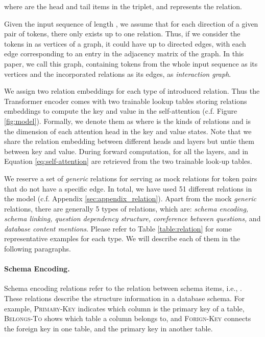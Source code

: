 \documentclass[11pt]{article}
\begin{document}
where  are the head and tail items in the triplet, and  represents the relation.

Given the input sequence  of length , we assume that for each direction of a given pair of tokens, there only exists up to one relation. Thus, if we consider the tokens in  as vertices of a graph, it could have up to  directed edges, with each edge corresponding to an entry in the adjacency matrix of the graph. In this paper, we call this graph, containing tokens from the whole input sequence as its vertices and the incorporated relations as its edges, as \emph{interaction graph}.

We assign two relation embeddings for each type of introduced relation. Thus the Transformer encoder comes with two trainable lookup tables storing relations embeddings to compute the key and value in the self-attention (c.f. Figure \ref{fig:model}). Formally, we denote them as  where  is the kinds of relations and  is the dimension of each attention head in the key and value states. Note that we share the relation embedding between different heads and layers but untie them between key and value. During forward computation, for all the layers,  and  in Equation \ref{eq:self-attention} are retrieved from the two trainable look-up tables.

We reserve a set of \emph{generic} relations for serving as mock relations for token pairs that do not have a specific edge. In total, we have used 51 different relations in the model (c.f. Appendix \ref{sec:appendix_relation}). Apart from the mock \emph{generic} relations, there are generally 5 types of relations, which are: \emph{schema encoding, schema linking, question dependency structure, coreference between questions,} and \emph{database content mentions}. Please refer to Table \ref{table:relation} for some representative examples for each type. We will describe each of them in the following paragraphs. 

\paragraph{Schema Encoding.} Schema encoding relations refer to the relation between schema items, i.e., . These relations describe the structure information in a database schema. For example, \textsc{Primary-Key} indicates which column is the primary key of a table, \textsc{Belongs-To} shows which table a column belongs to, and \textsc{Forign-Key} connects the foreign key in one table, and the primary key in another table.
\end{document}

